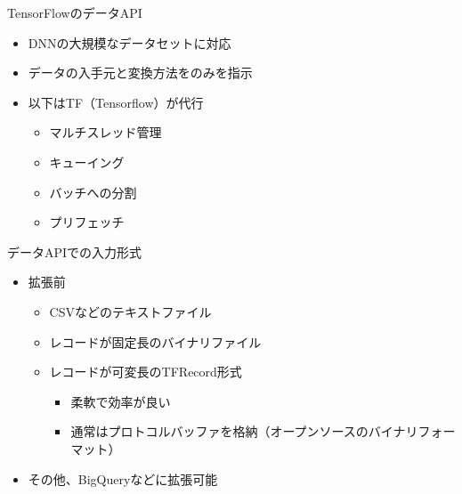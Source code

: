 \documentclass[aspectratio=169, dvipdfmx, 14pt, xcolor={svgnames,dvipsnames}, t]{beamer}
\begin{document}
\begin{frame}{TensorFlowのデータAPI}

  \begin{itemize}
    \tightlist
    \item
          DNNの大規模なデータセットに対応
    \item
          データの入手元と変換方法をのみを指示
    \item
          以下はTF（Tensorflow）が代行

          \begin{itemize}
            \tightlist
            \item
                  マルチスレッド管理
            \item
                  キューイング
            \item
                  バッチへの分割
            \item
                  プリフェッチ
          \end{itemize}
  \end{itemize}

\end{frame}


\begin{frame}{データAPIでの入力形式}

  \begin{itemize}
    \tightlist
    \item
          拡張前

          \begin{itemize}
            \tightlist
            \item
                  CSVなどのテキストファイル
            \item
                  レコードが固定長のバイナリファイル
            \item
                  レコードが可変長のTFRecord形式

                  \begin{itemize}
                    \tightlist
                    \item
                          柔軟で効率が良い
                    \item
                          通常はプロトコルバッファを格納（オープンソースのバイナリフォーマット）
                  \end{itemize}
          \end{itemize}
    \item
          その他、BigQueryなどに拡張可能
  \end{itemize}

\end{frame}
\end{document}
